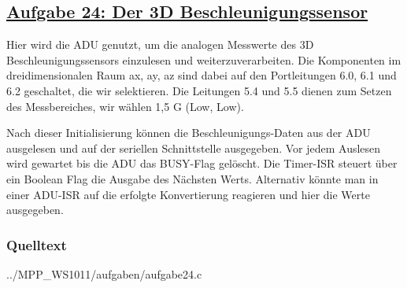 \subsection
{\href{http://cst.mi.fu-berlin.de/intern/19606-P-MPP/Aufgaben/040802.html}
{Aufgabe 24: Der 3D Beschleunigungssensor}}

Hier wird die ADU genutzt, um die analogen Messwerte des 3D
Beschleunigungssensors einzulesen und weiterzuverarbeiten. Die
Komponenten im dreidimensionalen Raum ax, ay, az sind dabei auf den
Portleitungen 6.0, 6.1 und 6.2 geschaltet, die wir selektieren. Die
Leitungen 5.4 und 5.5 dienen zum Setzen des Messbereiches, wir wählen
1,5 G (Low, Low).

Nach dieser Initialisierung können die Beschleunigungs-Daten
aus der ADU ausgelesen und auf der seriellen Schnittstelle
ausgegeben. Vor jedem Auslesen wird gewartet bis die ADU das BUSY-Flag
gelöscht. Die Timer-ISR steuert über ein Boolean Flag die Ausgabe des
Nächsten Werts. Alternativ könnte man in einer ADU-ISR auf die
erfolgte Konvertierung reagieren und hier die Werte ausgegeben.

\subsubsection*{Quelltext}


{../MPP_WS1011/aufgaben/aufgabe24.c}
